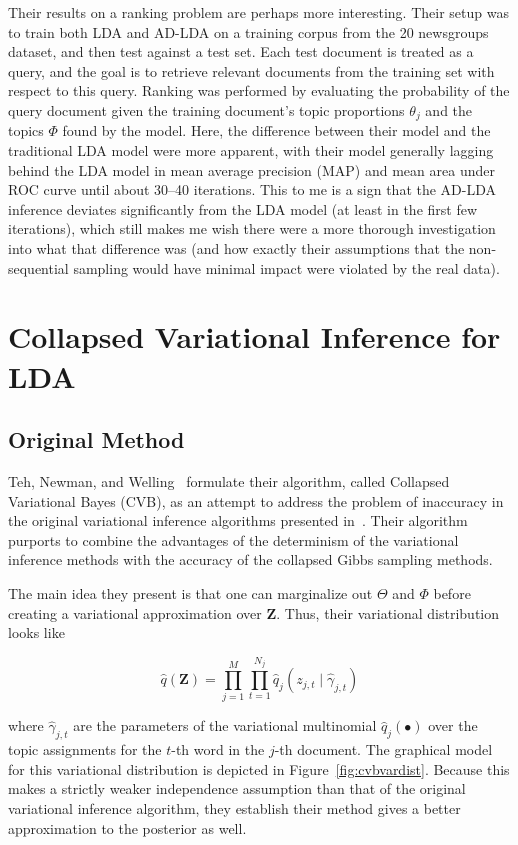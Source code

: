 \documentclass[11pt]{article}
\begin{document}
Their results on a ranking problem are perhaps more interesting. Their
setup was to train both LDA and AD-LDA on a training corpus from the 20
newsgroups dataset, and then test against a test set. Each test document is
treated as a query, and the goal is to retrieve relevant documents from the
training set with respect to this query. Ranking was performed by
evaluating the probability of the query document given the training
document's topic proportions $\theta_j$ and the topics $\Phi$ found by the
model. Here, the difference between their model and the traditional LDA
model were more apparent, with their model generally lagging behind the LDA
model in mean average precision (MAP) and mean area under ROC curve until
about 30--40 iterations. This to me is a sign that the AD-LDA inference
deviates significantly from the LDA model (at least in the first few
iterations), which still makes me wish there were a more thorough
investigation into what that difference was (and how exactly their
assumptions that the non-sequential sampling would have minimal impact were
violated by the real data).

\section{Collapsed Variational Inference for LDA}
\subsection{Original Method}

Teh, Newman, and Welling~\cite{Teh:2007:CVB} formulate their algorithm,
called Collapsed Variational Bayes (CVB), as an attempt to address the
problem of inaccuracy in the original variational inference algorithms
presented in~\cite{Blei:2003:LDA}. Their algorithm purports to combine the
advantages of the determinism of the variational inference methods with the
accuracy of the collapsed Gibbs sampling methods.

The main idea they present is that one can marginalize out $\Theta$ and
$\Phi$ before creating a variational approximation over $\mathbf{Z}$. Thus,
their variational distribution looks like

\begin{equation}
  \hat{q}(\mathbf{Z}) = \prod_{j=1}^M \prod_{t=1}^{N_j} \hat{q}_j(z_{j,t} \mid
  \hat{\gamma}_{j,t})
\end{equation}

where $\hat{\gamma}_{j,t}$ are the parameters of the variational
multinomial $\hat{q}_j(\bullet)$ over the topic assignments for the $t$-th
word in the $j$-th document. The graphical model for this variational
distribution is depicted in Figure~\ref{fig:cvbvardist}. Because this makes
a strictly weaker independence assumption than that of the original
variational inference algorithm, they establish their method gives a better
approximation to the posterior as well.
\end{document}
